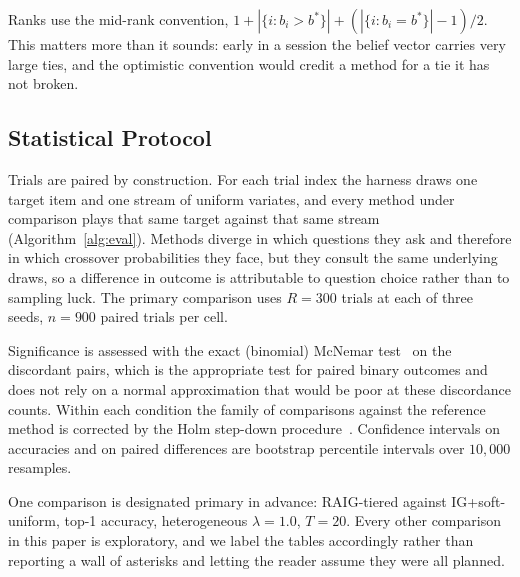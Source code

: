 Ranks use the mid-rank convention, $1 + |\{i : b_i > b^\ast\}| +
(|\{i : b_i = b^\ast\}| - 1)/2$. This matters more than it sounds: early in a
session the belief vector carries very large ties, and the optimistic
convention would credit a method for a tie it has not broken.

\subsection{Statistical Protocol}
\label{sec:stats}

Trials are paired by construction. For each trial index the harness draws one
target item and one stream of uniform variates, and every method under
comparison plays that same target against that same stream
(Algorithm~\ref{alg:eval}). Methods diverge in which questions they ask and
therefore in which crossover probabilities they face, but they consult the same
underlying draws, so a difference in outcome is attributable to question choice
rather than to sampling luck. The primary comparison uses $R=300$ trials at
each of three seeds, $n=900$ paired trials per cell.

Significance is assessed with the exact (binomial) McNemar
test~\cite{mcnemar1947} on the discordant pairs, which is the appropriate test
for paired binary outcomes and does not rely on a normal approximation that
would be poor at these discordance counts. Within each condition the family of
comparisons against the reference method is corrected by the Holm step-down
procedure~\cite{holm1979}. Confidence intervals on accuracies and on paired
differences are bootstrap percentile intervals over $10{,}000$ resamples.

One comparison is designated primary in advance: RAIG-tiered against
IG+soft-uniform, top-1 accuracy, heterogeneous $\lambda=1.0$, $T=20$. Every
other comparison in this paper is exploratory, and we label the tables
accordingly rather than reporting a wall of asterisks and letting the reader
assume they were all planned.
